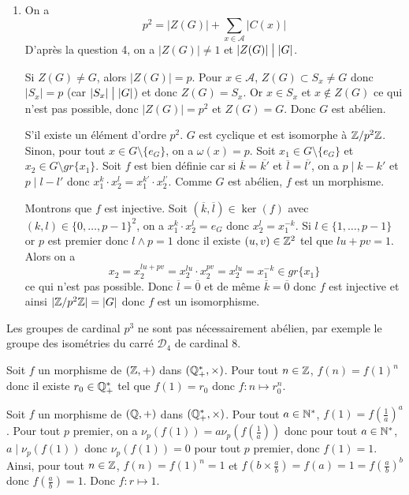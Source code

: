 \begin{solution}
\begin{enumerate}
		\item On a 
		$$p^{2}=\vert Z(G)\vert+\sum_{x\in\mathcal{A}}\vert C(x)\vert$$
		D'après la question 4, on a $\vert Z(G)\vert\neq1$ et $\vert Z(G)\vert\bigm|\vert G\vert$.

		Si $Z(G)\neq G$, alors $\vert Z(G)\vert=p$. Pour $x\in\mathcal{A}$, $Z(G)\subset S_{x}\neq G$ donc $\vert S_{x}\vert= p$ (car $\vert S_{x}\vert\bigm|\vert G\vert$) et donc $Z(G)=S_{x}$. Or $x\in S_{x}$ et $x\notin Z(G)$ ce qui n'est pas possible, donc $\vert Z(G)\vert=p^{2}$ et $Z(G)=G$. Donc $G$ est abélien.

		S'il existe un élément d'ordre $p^{2}$. $G$ est cyclique et est isomorphe à $\mathbb{Z}/p^{2}\mathbb{Z}$. Sinon, pour tout $x\in G\setminus\{e_{G}\}$, on a $\omega(x)=p$. Soit $x_{1}\in G\setminus\{e_{G}\}$ et $x_{2}\in G\setminus gr\{x_{1}\}$.
		Soit 
		$f$ est bien définie car si $\overline{k}=\overline{k'}$ et $\overline{l}=\overline{l'}$, on a $p\mid k-k'$ et $p\mid l-l'$ donc $x_{1}^{k}\cdot x_{2}^{l}=x_{1}^{k'}\cdot x_{2}^{l'}$. Comme $G$ est abélien, $f$ est un morphisme. 
		
		Montrons que $f$ est injective. Soit $(\overline{k},\overline{l})\in\ker(f)$ avec $(k,l)\in\{0,\dots,p-1\}^{2}$, on a $x_{1}^{k}\cdot x_{2}^{l}=e_{G}$ donc $x_{2}^{l}=x_{1}^{-k}$. Si $l\in\{1,\dots,p-1\}$ or $p$ est premier donc $l\wedge p=1$ donc il existe $(u,v)\in\mathbb{Z}^{2}$ tel que $lu+pv=1$. Alors on a 
		$$x_{2}=x_{2}^{lu+pv}=x_{2}^{lu}\cdot x_{2}^{pv}=x_{2}^{lu}=x_{1}^{-k}\in gr\{x_{1}\}$$ ce qui n'est pas possible. Donc $\overline{l}=\overline{0}$ et de même $\overline{k}=\overline{0}$ donc $f$ est injective et ainsi 
		$\vert\mathbb{Z}/p^{2}\mathbb{Z}\vert=\vert G\vert$ donc $f$ est un isomorphisme.
	\end{enumerate}
\end{solution}

\begin{remark}
	Les groupes de cardinal $p^{3}$ ne sont pas nécessairement abélien, par exemple le groupe des isométries du carré $\mathcal{D}_{4}$ de cardinal 8.
\end{remark}

\begin{solution}
	Soit $f$ un morphisme de $(\mathbb{Z},+)$ dans $(\mathbb{Q}_{+}^{*},\times)$. Pour tout $n\in\mathbb{Z}$, $f(n)=f(1)^{n}$ donc il existe $r_{0}\in\mathbb{Q}_{+}^{*}$ tel que $f(1)=r_{0}$ donc $f\colon n\mapsto r_{0}^{n}$.

	Soit $f$ un morphisme de $(\mathbb{Q},+)$ dans $(\mathbb{Q}_{+}^{*},\times)$. Pour tout $a\in\mathbb{N}^{*}$, $f(1)=f(\frac{1}{a})^{a}$. Pour tout $p$ premier, on a $\nu_{p}(f(1))=a\nu_{p}(f(\frac{1}{a}))$ donc pour tout $a\in\mathbb{N}^{*}$, $a\mid\nu_{p}(f(1))$ donc $\nu_{p}(f(1))=0$ pour tout $p$ premier, donc $f(1)=1$. Ainsi, pour tout $n\in\mathbb{Z}$, $f(n)=f(1)^{n}=1$ et $f(b\times\frac{a}{b})=f(a)=1=f(\frac{a}{b})^{b}$ donc $f(\frac{a}{b})=1$. Donc $f\colon r\mapsto 1$.
\end{solution}

